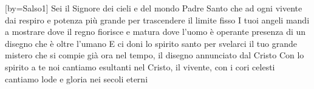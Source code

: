 [by={Salso1}]
\beginverse
Sei il Signore dei cieli e del mondo
Padre Santo che ad ogni vivente
dai respiro e potenza più grande
per trascendere il limite fisso
I tuoi angeli mandi a mostrare
dove il regno fiorisce e matura
dove l'uomo è operante presenza
di un disegno che è oltre l'umano
E ci doni lo spirito santo
per svelarci il tuo grande mistero
che si compie già ora nel tempo,
il disegno annunciato dal Cristo
Con lo spirito a te noi cantiamo
esultanti nel Cristo, il vivente,
con i cori celesti cantiamo
lode e gloria nei secoli eterni
\endverse
\endsong
